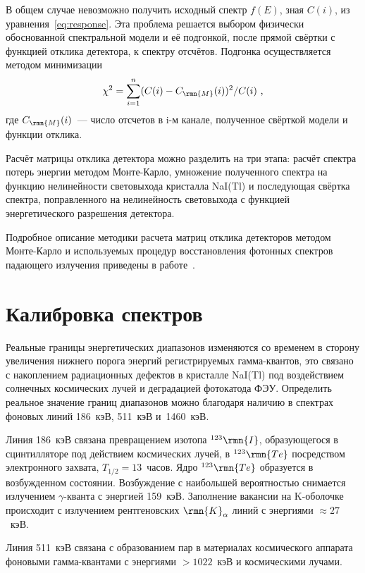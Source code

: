 В общем случае невозможно получить исходный спектр $f(E)$, зная $C(i)$, из 
уравнения~\ref{eq:response}.  Эта проблема решается выбором физически обоснованной 
спектральной модели и её подгонкой, после прямой свёртки с функцией отклика детектора, 
к спектру отсчётов. Подгонка осуществляется методом минимизации
\begin{equation}\label{eq:chisq}
    \chi^2=\sum\limits_{i=1}^n(C(i)-C_\rmn{M}(i))^2/C(i) \mbox{ ,}
\end{equation}
где $C_\rmn{M}(i)$~--- число отсчетов в i-м канале, полученное свёрткой модели и функции отклика.

Расчёт матрицы отклика детектора можно разделить на три этапа: расчёт спектра 
потерь энергии методом Монте-Карло, умножение полученного спектра на функцию 
нелинейности световыхода кристалла NaI(Tl) и последующая свёртка спектра, 
поправленного на нелинейность световыхода с функцией энергетического разрешения 
детектора.

Подробное описание методики расчета матриц отклика детекторов методом Монте-Карло 
и используемых процедур восстановления фотонных спектров падающего излучения 
приведены в работе~\citep{Terekhov_1998AIPC}.

\section{Калибровка спектров}
Реальные границы энергетических диапазонов изменяются со временем в сторону 
увеличения нижнего порога энергий регистрируемых гамма-квантов, это  
связано с накоплением радиационных дефектов в кристалле NaI(Tl) под воздействием 
солнечных космических лучей и деградацией фотокатода ФЭУ. Определить реальное значение 
границ диапазонов можно благодаря наличию в спектрах фоновых линий 186~кэВ, 511~кэВ и~1460~кэВ.

Линия 186~кэВ связана превращением изотопа $^{123}\rmn{I}$, образующегося в 
сцинтилляторе под действием космических лучей, в $^{123}\rmn{Te}$ посредством 
электронного захвата, $T_{1/2}=13$~часов. Ядро $^{123}\rmn{Te}$ образуется в 
возбужденном состоянии. Возбуждение с наибольшей вероятностью снимается излучением $\gamma$-кванта 
с энергией 159~кэВ. Заполнение вакансии на K-оболочке происходит с излучением 
рентгеновских $\rmn{K}_{\alpha}$ линий с энергиями $\approx 27$~кэВ.

Линия 511~кэВ связана с образованием пар в материалах космического аппарата 
фоновыми гамма-квантами с энергиями $>1022$~кэВ и космическими лучами.

